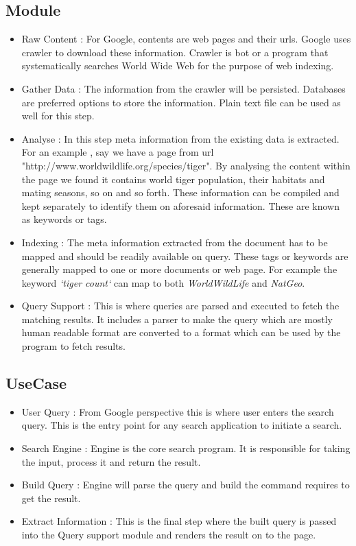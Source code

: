 \documentclass[9pt,twocolumn,twoside]{../../styles/osajnl}
\begin{document}
\subsection{Module}
\begin{itemize}

\item Raw Content : For Google, contents are web pages and their urls. Google 
uses crawler to download these information. Crawler is bot or a program that
 systematically searches World Wide Web for the purpose of web indexing.

\item Gather Data : The information from the crawler will be persisted. 
Databases are preferred options to store the information. Plain text file 
can be used as well for this step.

\item Analyse : In this step meta information from the existing data is 
extracted. For an example , say we have a page from url 
"http://www.worldwildlife.org/species/tiger". By analysing the content within 
the page we found it contains world tiger population, their habitats and 
mating seasons, so on and so forth. These information can be compiled and kept 
separately to identify them on aforesaid information. These are known as 
keywords or tags.

\item Indexing : The meta information extracted from the document has to be 
mapped and should be readily available on query. These tags or keywords 
are generally mapped to one or more documents or web page. For example 
the keyword \textit {`tiger count`} can map to both \textit{WorldWildLife} 
and \textit{NatGeo}. 

\item Query Support : This is where queries are parsed and executed to fetch 
the matching results. It includes a parser to make the query which are mostly
human readable format are converted to a format which can be used by the 
program to fetch results.
\end{itemize}

\subsection{UseCase}
\begin{itemize}
\item User Query : From Google perspective this is where user enters the 
search query. This is the entry point for any search application to 
initiate a search.

\item Search Engine :  Engine is the core search program. It is responsible 
for taking the input, process it and return the result.

\item Build Query : Engine will parse the query and build the command requires 
to get the result. 

\item Extract Information : This is the final step where the built query is 
passed into the Query support module and renders the result on to the page. 
\end{itemize}
\end{document}
